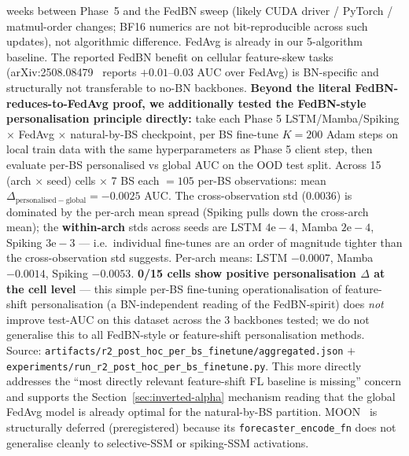 \documentclass[journal]{IEEEtran}
\begin{document}
\begin{itemize}
weeks between Phase~5 and the FedBN sweep (likely CUDA driver / PyTorch / matmul-order changes; BF16 numerics are not bit-reproducible across such updates), not algorithmic difference. FedAvg is already in our 5-algorithm baseline. The reported FedBN benefit on cellular feature-skew tasks (arXiv:2508.08479~\cite{arXiv2508_08479} reports $+0.01$--$0.03$ AUC over FedAvg) is BN-specific and structurally not transferable to no-BN backbones. \textbf{Beyond the literal FedBN-reduces-to-FedAvg proof, we additionally tested the FedBN-style personalisation principle directly:} take each Phase 5 LSTM/Mamba/Spiking $\times$ FedAvg $\times$ natural-by-BS checkpoint, per BS fine-tune $K=200$ Adam steps on local train data with the same hyperparameters as Phase 5 client step, then evaluate per-BS personalised vs global AUC on the OOD test split. Across 15 (arch $\times$ seed) cells $\times$ 7 BS each $= 105$ per-BS observations: mean $\Delta_{\mathrm{personalised}-\mathrm{global}} = -0.0025$ AUC. The cross-observation std ($0.0036$) is dominated by the per-arch mean spread (Spiking pulls down the cross-arch mean); the \textbf{within-arch} stds across seeds are LSTM $4\mathrm{e}{-}4$, Mamba $2\mathrm{e}{-}4$, Spiking $3\mathrm{e}{-}3$ --- i.e.\ individual fine-tunes are an order of magnitude tighter than the cross-observation std suggests. Per-arch means: LSTM $-0.0007$, Mamba $-0.0014$, Spiking $-0.0053$. \textbf{0/15 cells show positive personalisation $\Delta$ at the cell level} --- this simple per-BS fine-tuning operationalisation of feature-shift personalisation (a BN-independent reading of the FedBN-spirit) does \emph{not} improve test-AUC on this dataset across the 3 backbones tested; we do not generalise this to all FedBN-style or feature-shift personalisation methods. Source: \lstinline|artifacts/r2_post_hoc_per_bs_finetune/aggregated.json| $+$ \lstinline|experiments/run_r2_post_hoc_per_bs_finetune.py|. This more directly addresses the ``most directly relevant feature-shift FL baseline is missing'' concern and supports the Section~\ref{sec:inverted-alpha} mechanism reading that the global FedAvg model is already optimal for the natural-by-BS partition. MOON~\cite{Li2021_MOON} is structurally deferred (preregistered) because its \lstinline|forecaster_encode_fn| does not generalise cleanly to selective-SSM or spiking-SSM activations.


\end{itemize}
\end{document}
